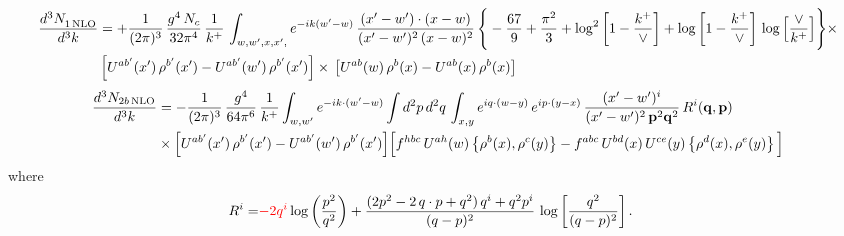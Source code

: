 \documentclass[9pt]{article}
\numberwithin{equation}{section}
\newcommand{\chg}[1]{{\color{red}#1}}
\begin{document}
\begin{align}
     \frac{d^{3}N_{1\,\rm NLO}^{\rm}}{d^{3}k} &  =  +\frac{1}{(2\pi)^{3}}\, \frac{g^{4}\,N_{c}}{32\pi^{4}}\,\frac{1}{k^{+}}\, \int_{w, w',x,x',} e^{-ik(w^\prime-w)}\, \frac{(x'-w')\cdot (x-w)}{(x'-w')^{2}\, (x-w)^{2}}\, \Bigg\{ -\frac{67}{9}+\frac{\pi^{2}}{3}+\log^{2}{\left[1-\frac{k^{+}}{\vee}\right]}+\log{\left[1-\frac{k^{+}}{\vee}\right]}\,\log{\left[\frac{\vee}{k^{+}}\right]}\Bigg\}\times\notag \\ & \left[U^{ab'}(x')\,\rho^{b'}(x') - U^{ab'}(w')\,\rho^{b'}(x')\right]\times\,\left[U^{ab}(w)\,\rho^{b}(x) - U^{ab}(x)\,\rho^{b}(x)\right]
\end{align}  
\begin{align}
\frac{d^{3}N_{2b\,\rm NLO}}{d^{3}k} & = -\frac{1}{(2\pi)^{3}}\,\frac{g^{4}}{64\pi^{6}}\,\frac{1}{k^{+}}\int_{w,w'} e^{-ik\cdot(w'-w)}
\int d^{2}p\,d^{2}q\,\int_{x,y} e^{iq\cdot(w-y)}\,e^{ip\cdot(y-x)}\,\frac{(x'-w')^{i}}{(x'-w')^{2}\,\mathbf{p}^{2}\mathbf{q}^{2}}\,R^{i}(\mathbf{q},\mathbf{p})\notag\\ &\times\Big[U^{ab'}(x')\,\rho^{b'}(x')-U^{ab'}(w')\,\rho^{b'}(x')\Big]
\Big[f^{hbc}\,U^{ah}(w)\left\{\rho^{b}(x),\rho^{c}(y)\right\}-f^{abc}\,U^{bd}(x)\,U^{ce}(y)\left\{\rho^{d}(x),\rho^{e}(y)\right\}\Big]
\end{align}
where
\begin{align}
R^{i} =& \chg{-2q^{i}}\log\left(\frac{p^{2}}{q^{2}}\right)
+\frac{(2p^{2}-2\,q\cdot p+q^{2})\,q^{i}+q^{2}p^{i}}{(q-p)^{2}}\,
\log\left[\frac{q^{2}}{(q-p)^{2}}\right].
\end{align}
\end{document}
